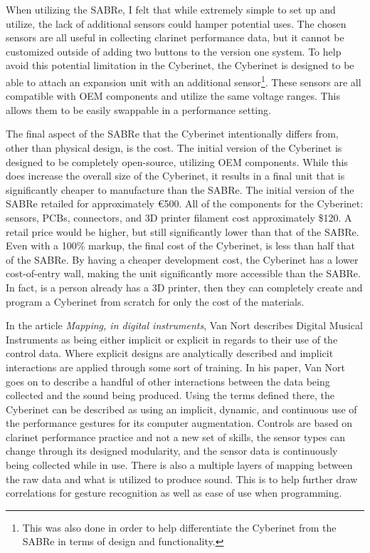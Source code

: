 When utilizing the SABRe, I felt that while extremely simple to set up and utilize, the lack of additional sensors could hamper potential uses. The chosen sensors are all useful in collecting clarinet performance data, but it cannot be customized outside of adding two buttons to the version one system. To help avoid this potential limitation in the Cyberinet, the Cyberinet is designed to be able to attach an expansion unit with an additional sensor\footnote{This was also done in order to help differentiate the Cyberinet from the SABRe in terms of design and functionality.}. These sensors are all compatible with OEM components and utilize the same voltage ranges. This allows them to be easily swappable in a performance setting.

The final aspect of the SABRe that the Cyberinet intentionally differs from, other than physical design, is the cost. The initial version of the Cyberinet is designed to be completely open-source, utilizing OEM components. While this does increase the overall size of the Cyberinet, it results in a final unit that is significantly cheaper to manufacture than the SABRe. The initial version of the SABRe retailed for approximately €500. All of the components for the Cyberinet: sensors, PCBs, connectors, and 3D printer filament cost approximately \$120. A retail price would be higher, but still significantly lower than that of the SABRe. Even with a 100\% markup, the final cost of the Cyberinet, is less than half that of the SABRe. By having a cheaper development cost, the Cyberinet has a lower cost-of-entry wall, making the unit significantly more accessible than the SABRe. In fact, is a person already has a 3D printer, then they can completely create and program a Cyberinet from scratch for only the cost of the materials.

In the article \textit{Mapping, in digital instruments}\cite{vanNortMapping2007}, Van Nort describes Digital Musical Instruments as being either implicit or explicit in regards to their use of the control data. Where explicit designs are analytically described and implicit interactions are applied through some sort of training\cite{vanNortMapping2007}. In his paper, Van Nort goes on to describe a handful of other interactions between the data being collected and the sound being produced. Using the terms defined there, the Cyberinet can be described as using an implicit, dynamic, and continuous use of the performance gestures for its computer augmentation. Controls are based on clarinet performance practice and not a new set of skills, the sensor types can change through its designed modularity, and the sensor data is continuously being collected while in use. There is also a multiple layers of mapping between the raw data and what is utilized to produce sound. This is to help further draw correlations for gesture recognition as well as ease of use when programming.

